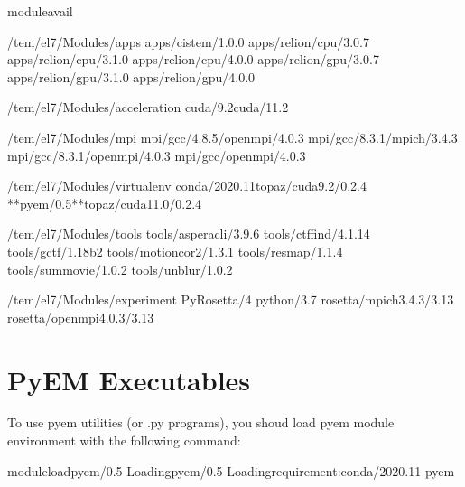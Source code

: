 \documentclass[a4paper,11pt,english]{sphinxmanual}
\begin{document}
\begin{sphinxVerbatim}[commandchars=\\\{\}]
\PYGZdl{}\PYGZgt{}moduleavail

\PYGZhy{}\PYGZhy{}\PYGZhy{}\PYGZhy{}\PYGZhy{}\PYGZhy{}\PYGZhy{}\PYGZhy{}/tem/el7/Modules/apps\PYGZhy{}\PYGZhy{}\PYGZhy{}\PYGZhy{}\PYGZhy{}\PYGZhy{}\PYGZhy{}\PYGZhy{}
apps/cistem/1.0.0
apps/relion/cpu/3.0.7
apps/relion/cpu/3.1.0
apps/relion/cpu/4.0.0
apps/relion/gpu/3.0.7
apps/relion/gpu/3.1.0
apps/relion/gpu/4.0.0

\PYGZhy{}\PYGZhy{}\PYGZhy{}\PYGZhy{}/tem/el7/Modules/acceleration\PYGZhy{}\PYGZhy{}\PYGZhy{}\PYGZhy{}
cuda/9.2cuda/11.2

\PYGZhy{}\PYGZhy{}\PYGZhy{}\PYGZhy{}\PYGZhy{}\PYGZhy{}\PYGZhy{}\PYGZhy{}/tem/el7/Modules/mpi\PYGZhy{}\PYGZhy{}\PYGZhy{}\PYGZhy{}\PYGZhy{}\PYGZhy{}\PYGZhy{}\PYGZhy{}\PYGZhy{}
mpi/gcc/4.8.5/openmpi/4.0.3
mpi/gcc/8.3.1/mpich/3.4.3
mpi/gcc/8.3.1/openmpi/4.0.3
mpi/gcc/openmpi/4.0.3

\PYGZhy{}\PYGZhy{}\PYGZhy{}\PYGZhy{}\PYGZhy{}/tem/el7/Modules/virtualenv\PYGZhy{}\PYGZhy{}\PYGZhy{}\PYGZhy{}\PYGZhy{}
conda/2020.11topaz/cuda\PYGZhy{}9.2/0.2.4
**pyem/0.5**topaz/cuda\PYGZhy{}11.0/0.2.4

\PYGZhy{}\PYGZhy{}\PYGZhy{}\PYGZhy{}\PYGZhy{}\PYGZhy{}\PYGZhy{}/tem/el7/Modules/tools\PYGZhy{}\PYGZhy{}\PYGZhy{}\PYGZhy{}\PYGZhy{}\PYGZhy{}\PYGZhy{}\PYGZhy{}
tools/aspera\PYGZhy{}cli/3.9.6
tools/ctffind/4.1.14
tools/gctf/1.18\PYGZus{}b2
tools/motioncor2/1.3.1
tools/resmap/1.1.4
tools/summovie/1.0.2
tools/unblur/1.0.2

\PYGZhy{}\PYGZhy{}\PYGZhy{}\PYGZhy{}\PYGZhy{}/tem/el7/Modules/experiment\PYGZhy{}\PYGZhy{}\PYGZhy{}\PYGZhy{}\PYGZhy{}
PyRosetta/4
python/3.7
rosetta/mpich\PYGZhy{}3.4.3/3.13
rosetta/openmpi\PYGZhy{}4.0.3/3.13
\end{sphinxVerbatim}


\section{PyEM Executables}
\label{\detokenize{pyem:pyem-executables}}
\sphinxAtStartPar
To use pyem utilities (or .py programs), you shoud load pyem module environment with the following command:

\begin{sphinxVerbatim}[commandchars=\\\{\}]
\PYGZdl{}\PYGZgt{}moduleloadpyem/0.5
Loadingpyem/0.5
Loadingrequirement:conda/2020.11
pyem\PYGZdl{}\PYGZgt{}
\end{sphinxVerbatim}
\end{document}
